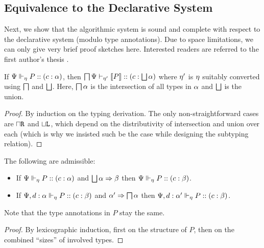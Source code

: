\documentclass[submission,copyright,creativecommons]{eptcs}
\begin{document}


\subsection{Equivalence to the Declarative System}

Next, we show that the algorithmic system is sound and complete with respect to the declarative system (modulo type annotations). Due to space limitations, we can only give very brief proof sketches here. Interested readers are referred to the first author's thesis \cite{Acay16}.

\begin{theorem}
  If ${\Psi} \Vdash_{\eta} P :: (c : \alpha)$, then ${\operatorname{\bigsqcap}\Psi} \vdash_{\eta'} \left \llbracket {P} \right \rrbracket :: (c : \operatorname{\bigsqcup} \alpha)$ where $\eta'$ is $\eta$ suitably converted using $\operatorname{\bigsqcap}$ and $\operatorname{\bigsqcup}$. Here, $\operatorname{\bigsqcap}\alpha$ is the intersection of all types in $\alpha$ and $\operatorname{\bigsqcup}$ is the union.
\end{theorem}
\begin{proof}
  By induction on the typing derivation. The only non-straightforward cases are $\mathbin{\sqcap}\texttt{R}$ and $\mathbin{\sqcup}\texttt{L}$, which depend on the distributivity of intersection and union over each (which is why we insisted such be the case while designing the subtyping relation).
\end{proof}

\begin{lemma}
  \label{algorithmic:delegation-sub}
  The following are admissible:
  \begin{itemize}
    \item If ${\Psi} \Vdash_{\eta} P :: (c : \alpha)$ and $\operatorname{\bigsqcup}\alpha \Rightarrow \beta$ then ${\Psi} \Vdash_{\eta} P :: (c : \beta)$.
    \item If ${\Psi, d : \alpha} \Vdash_{\eta} P :: (c : \beta)$ and $\alpha' \Rightarrow \operatorname{\bigsqcap}\alpha$ then ${\Psi, d : \alpha'} \Vdash_{\eta} P :: (c : \beta)$.
  \end{itemize}
  Note that the type annotations in $P$ stay the same.
\end{lemma}
\begin{proof}
  By lexicographic induction, first on the structure of $P$, then on the combined ``sizes'' of involved types.
\end{proof}
\end{document}
